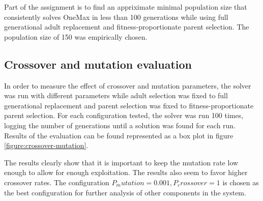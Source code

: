 \documentclass[twocolumn,oneside]{amsart}
\begin{document}
Part of the assignment is to find an appriximate minimal population size that consistently solves OneMax in less than 100 generations while using full generational adult replacement and fitness-proportionate parent selection.
The population size of 150 was empirically chosen.

\subsection{Crossover and mutation evaluation}

In order to measure the effect of crossover and mutation parameters, the solver was run with different parameters while adult selection was fixed to full generational replacement and parent selection was fixed to fitness-proportionate parent selection.
For each configuration tested, the solver was run 100 times, logging the number of generations until a solution was found for each run.
Results of the evaluation can be found represented as a box plot in figure \ref{figure:crossover-mutation}.

The results clearly show that it is important to keep the mutation rate low enough to allow for enough exploitation.
The results also seem to favor higher crossover rates.
The configuration $ P_mutation = 0.001, P_crossover = 1 $ is chosen as the best configuration for further analysis of other components in the system.
\end{document}
